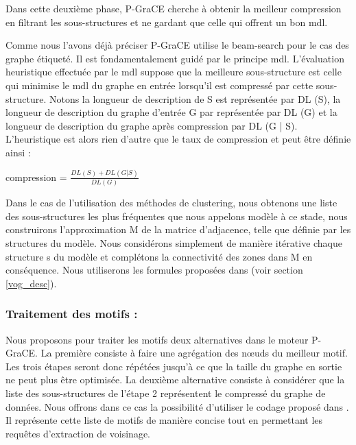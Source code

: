 \documentclass[a4paper,oneside,12pt]{report}
\theoremstyle{definition}
\begin{document}
		 Dans cette deuxième phase, P-GraCE cherche à obtenir la meilleur compression en filtrant les sous-structures et ne gardant que celle qui offrent un bon \gls{mdl}. 
		 
Comme nous l'avons déjà préciser P-GraCE utilise le beam-search pour le cas des graphe  étiqueté. Il est fondamentalement guidé par le principe \gls{mdl}. L'évaluation heuristique effectuée par le \gls{mdl} suppose que la meilleure sous-structure est celle qui minimise le \gls{mdl} du graphe en entrée lorsqu'il est compressé par cette sous-structure. Notons la longueur de description de S est représentée par DL (S), la longueur de description du graphe d'entrée G par représentée par DL (G) et la longueur de description du graphe après compression par DL (G | S). L'heuristique est alors rien d'autre que le taux de compression et peut être définie ainsi :
		 
		\begin{center}
		compression = $\frac{DL(S)+DL(G|S)} {DL(G)}$
		\end{center}
		 
   
		 
		 Dans le cas de l'utilisation des méthodes de clustering, nous obtenons une liste des sous-structures les plus fréquentes que nous appelons modèle à ce stade, nous construirons l'approximation M de la matrice d'adjacence, telle que définie par les structures du modèle. Nous considérons simplement de manière itérative chaque structure s du modèle et complétons la connectivité des zones dans M en conséquence. Nous utiliserons les formules proposées dans \citep{koutra2015summarizing} (voir section \ref{vog_desc}). 
		 
		 
		 
		   
		\subsubsection{Traitement des motifs :}
		
		Nous proposons pour traiter les motifs deux alternatives dans le moteur P-GraCE. La première consiste à faire une agrégation des nœuds du meilleur motif. Les trois étapes seront donc répétées jusqu'à ce que la taille du graphe en sortie ne peut plus être optimisée. La deuxième alternative consiste à considérer que la liste des sous-structures de l'étape 2 représentent le compressé du graphe de données. Nous offrons dans ce cas la possibilité d'utiliser le codage proposé dans \citep{liu2018reducing}. Il représente cette liste de motifs de manière concise tout en permettant les requêtes d'extraction de voisinage. 
		
\end{document}
